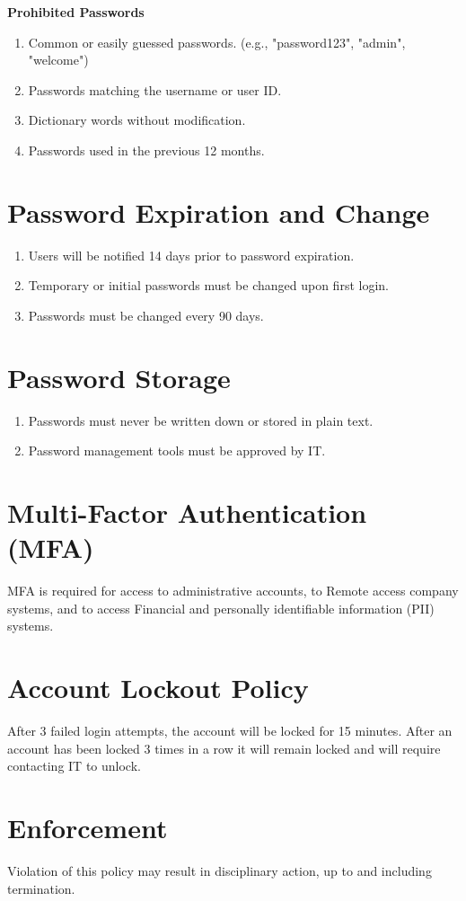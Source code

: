 \textbf{Prohibited Passwords}
\begin{enumerate}
    \item Common or easily guessed passwords. (e.g., "password123", "admin", "welcome")
    \item Passwords matching the username or user ID.
    \item Dictionary words without modification.
    \item Passwords used in the previous 12 months.
\end{enumerate}

\section{Password Expiration and Change}
\begin{enumerate}
    \item Users will be notified 14 days prior to password expiration.
    \item Temporary or initial passwords must be changed upon first login.
    \item Passwords must be changed every 90 days.
\end{enumerate}

\section{Password Storage}
\begin{enumerate}
    \item Passwords must never be written down or stored in plain text.
    \item Password management tools must be approved by IT.
\end{enumerate}

\section{Multi-Factor Authentication (MFA)}
MFA is required for access to administrative accounts, to Remote access company systems, and to access Financial and personally identifiable information (PII) systems.

\section{Account Lockout Policy}
After 3 failed login attempts, the account will be locked for 15 minutes. After an account has been locked 3 times in a row it will remain locked and will require contacting IT to unlock.

\section{Enforcement}
Violation of this policy may result in disciplinary action, up to and including termination.

